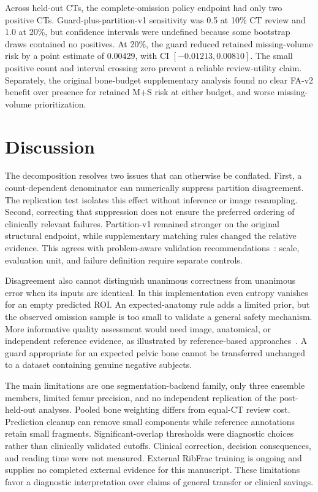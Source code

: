 \documentclass[conference]{IEEEtran}
\begin{document}
Across held-out CTs, the complete-omission policy endpoint had only two positive CTs. Guard-plus-partition-v1 sensitivity was 0.5 at 10\% CT review and 1.0 at 20\%, but confidence intervals were undefined because some bootstrap draws contained no positives. At 20\%, the guard reduced retained missing-volume risk by a point estimate of 0.00429, with CI $[-0.01213,0.00810]$. The small positive count and interval crossing zero prevent a reliable review-utility claim. Separately, the original bone-budget supplementary analysis found no clear FA-v2 benefit over presence for retained M+S risk at either budget, and worse missing-volume prioritization.

\section{Discussion}
The decomposition resolves two issues that can otherwise be conflated. First, a count-dependent denominator can numerically suppress partition disagreement. The replication test isolates this effect without inference or image resampling. Second, correcting that suppression does not ensure the preferred ordering of clinically relevant failures. Partition-v1 remained stronger on the original structural endpoint, while supplementary matching rules changed the relative evidence. This agrees with problem-aware validation recommendations~\cite{reinke2024,maier2024}: scale, evaluation unit, and failure definition require separate controls.

Disagreement also cannot distinguish unanimous correctness from unanimous error when its inputs are identical. In this implementation even entropy vanishes for an empty predicted ROI. An expected-anatomy rule adds a limited prior, but the observed omission sample is too small to validate a general safety mechanism. More informative quality assessment would need image, anatomical, or independent reference evidence, as illustrated by reference-based approaches~\cite{valindria2017}. A guard appropriate for an expected pelvic bone cannot be transferred unchanged to a dataset containing genuine negative subjects.

The main limitations are one segmentation-backend family, only three ensemble members, limited femur precision, and no independent replication of the post-held-out analyses. Pooled bone weighting differs from equal-CT review cost. Prediction cleanup can remove small components while reference annotations retain small fragments. Significant-overlap thresholds were diagnostic choices rather than clinically validated cutoffs. Clinical correction, decision consequences, and reading time were not measured. External RibFrac training is ongoing and supplies no completed external evidence for this manuscript. These limitations favor a diagnostic interpretation over claims of general transfer or clinical savings.
\end{document}
